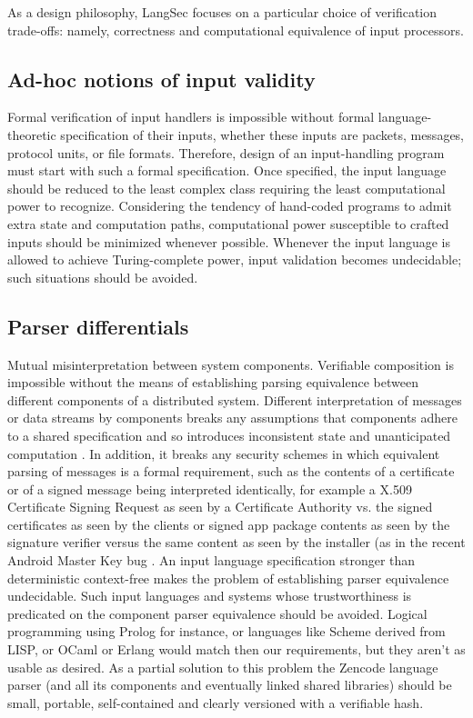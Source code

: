 \documentclass{svproc}
\begin{document}
As a design philosophy, LangSec focuses on a particular choice of
verification trade-offs: namely, correctness and computational
equivalence of input processors.

\subsection{Ad-hoc notions of input validity}

Formal verification of input handlers is impossible without formal
language-theoretic specification of their inputs, whether these inputs
are packets, messages, protocol units, or file formats. Therefore,
design of an input-handling program must start with such a formal
specification.  Once specified, the input language should be reduced
to the least complex class requiring the least computational power to
recognize. Considering the tendency of hand-coded programs to admit
extra state and computation paths, computational power susceptible to
crafted inputs should be minimized whenever possible. Whenever the
input language is allowed to achieve Turing-complete power, input
validation becomes undecidable; such situations should be avoided.

\subsection{Parser differentials}

Mutual misinterpretation between system components. Verifiable
composition is impossible without the means of establishing parsing
equivalence between different components of a distributed
system. Different interpretation of messages or data streams by
components breaks any assumptions that components adhere to a shared
specification and so introduces inconsistent state and unanticipated
computation \cite{DBLP:conf/secdev/MomotBHP16}. In addition, it breaks
any security schemes in which equivalent parsing of messages is a
formal requirement, such as the contents of a certificate or of a
signed message being interpreted identically, for example a X.509
Certificate Signing Request as seen by a Certificate Authority vs. the
signed certificates as seen by the clients or signed app package
contents as seen by the signature verifier versus the same content as
seen by the installer (as in the recent Android Master Key bug
\cite{freeman2013exploit}. An input language specification stronger
than deterministic context-free makes the problem of establishing
parser equivalence undecidable. Such input languages and systems whose
trustworthiness is predicated on the component parser equivalence
should be avoided. Logical programming using Prolog for instance, or
languages like Scheme derived from LISP, or OCaml or Erlang would
match then our requirements, but they aren't as usable as desired. As
a partial solution to this problem the Zencode language parser (and
all its components and eventually linked shared libraries) should be
small, portable, self-contained and clearly versioned with a
verifiable hash.
\end{document}
